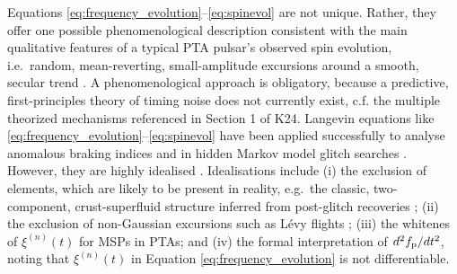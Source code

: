 \documentclass[fleqn,usenatbib,useAMS]{mnras}
\begin{document}
Equations \eqref{eq:frequency_evolution}--\eqref{eq:spinevol} are not unique. Rather, they offer one possible phenomenological description consistent with the main qualitative features of a typical PTA pulsar's observed spin evolution, i.e.\ random, mean-reverting, small-amplitude excursions around a smooth, secular trend \citep{NANOgrav2023,EPTA2023,Zic2023arXiv230616230Z}. A phenomenological approach is obligatory, because a predictive, first-principles theory of timing noise does not currently exist, c.f. the multiple theorized mechanisms referenced in Section 1 of K24. Langevin equations like \eqref{eq:frequency_evolution}--\eqref{eq:spinevol} have been applied successfully to analyse anomalous braking indices \citep{Vargas} and in hidden Markov model glitch searches \citep{Melatos2020ApJ...896...78M,Lower2021MNRAS.508.3251L,Dunn2022,Dunn2023MNRAS.522.5469D}. However, they are highly idealised \citep{Meyers2021,Myers2021MNRAS.502.3113M,Vargas}. Idealisations include (i) the exclusion of elements, which are likely to be present in reality, e.g.\ the classic, two-component, crust-superfluid structure inferred from post-glitch recoveries \citep{Baym1969,vanEysden,Alpar2017MNRAS.471.4827G,Myers2021MNRAS.502.3113M,Meyers2021}; (ii) the exclusion of non-Gaussian excursions such as L\'{e}vy flights \citep{Sornette2004}; (iii) the whitenes of $\xi^{(n)}(t)$ for MSPs in PTAs; and (iv) the formal interpretation of $d^2 f_{\rm p} / dt^2$, noting that $\xi^{(n)}(t)$ in Equation \eqref{eq:frequency_evolution} is not differentiable.
\end{document}
